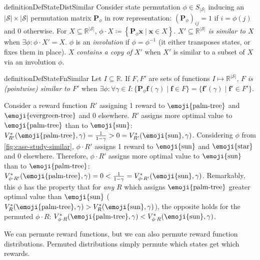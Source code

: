 \documentclass{article}
\renewcommand{\abs}[1]{\left|#1\right|}
\renewcommand{\set}[1]{\left\{#1\right\}}
\newcommand*{\defeq}{\coloneqq} %
\newcommand*{\x}{\mathbf{x}} %
\newcommand*{\reals}{\mathbb{R}}
\newcommand*{\permute}[1][\phi]{\mathbf{P}_{#1}} %
\newcommand*{\St}{\mathcal{S}}
\newcommand*{\rewardVS}{\reals^{\abs{\St}}} %
\newcommand*{\f}{\mathbf{f}} %
\newcommand*{\geom}[1][1]{\frac{#1}{1-\gamma}}
\newcommand*{\inv}{^{-1}}
\newcommand*{\mdpPermGroup}{S_{\abs{\St}}}
\theoremstyle{definition}
\newcommand*{\topleft}{\text{\emoji{evergreen-tree}}}
\newcommand*{\farleft}{\text{\emoji{palm-tree}}}
\newcommand*{\topright}{\text{\emoji{star}}}
\newcommand*{\farright}{\text{\emoji{sun}}}
\newcommand*{\topleft}{\ell_{\nwarrow}}
\newcommand*{\farleft}{\ell_{\swarrow}}
\newcommand*{\topright}{r_{\nearrow}}
\newcommand*{\farright}{r_{\searrow}}
\begin{document}
\begin{restatable}{definition}{DefStateDistSimilar}\label{def:dist-sim}
Consider state permutation $\phi\in\mdpPermGroup$ inducing an $\abs{\St}\times \abs{\St}$ permutation matrix $\permute$ in row representation: $(\permute)_{ij}=1$ if $i=\phi(j)$ and $0$ otherwise. For $X\subseteq \rewardVS$, $\phi\cdot X\defeq \set{\permute \x \mid \x \in X}$. $X'\subseteq \rewardVS$ \emph{is similar to $X$} when $\exists \phi: \phi\cdot X'=X$. $\phi$ is an \emph{involution} if $\phi=\phi\inv$ (it either transposes states, or fixes them in place). $X$ \emph{contains a copy of $X'$} when $X'$ is similar to a subset of $X$ via an involution $\phi$.
\end{restatable}
\begin{restatable}{definition}{DefStateFnSimilar}\label{def:dist-fn-sim}
Let $I\subseteq \reals$. If $F,F'$ are sets of functions $I\mapsto \rewardVS$, $F$ \emph{is (pointwise) similar to $F'$} when $\exists \phi:\forall \gamma\in I: \{\permute \f(\gamma) \mid \f \in F\}= \{\f'(\gamma) \mid \f' \in F'\}$. \end{restatable} 
 
Consider a reward function $R'$ assigning 1 reward to  $\farleft$ and $\topleft$ and 0 elsewhere. $R'$ assigns more optimal value to $\farleft$ than to $\farright$: $\VfNoResize[*][R']{\farleft,\gamma}=\geom> 0=\VfNoResize[*][R']{\farright,\gamma}$. Considering $\phi$ from \cref{fig:case-study-similar}, $\phi\cdot R'$ assigns 1 reward to $\farright$ and $\topright$ and 0 elsewhere. Therefore, $\phi\cdot R'$ assigns more optimal value to $\farright$ than to $\farleft$: $\VfNoResize[*][\phi\cdot R']{\farleft,\gamma}=0<\geom =\VfNoResize[*][\phi\cdot R']{\farright,\gamma}$. Remarkably, this $\phi$ has the property that for \emph{any} $R$ which assigns $\farleft$ greater optimal value than $\farright$ (\ie{} $\VfNoResize{\farleft,\gamma}> \VfNoResize{\farright,\gamma}$), the opposite holds for the permuted $\phi\cdot R$: $\VfNoResize[*][\phi\cdot R]{\farleft,\gamma}< \VfNoResize[*][\phi\cdot R]{\farright,\gamma}$. 

We can permute reward functions, but we can also permute reward function distributions. Permuted distributions simply permute which states get which rewards.
\end{document}
